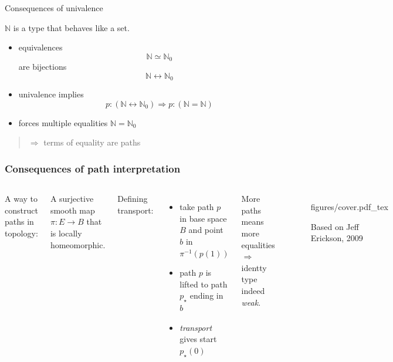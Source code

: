 \documentclass[english]{beamer}
\newcommand{\incfig}[1]{%
    \def\svgwidth{\columnwidth}
    {#1.pdf_tex}
}
\newcommand{\fig}[2]{
    \begin{figure}\begin{center}\texttt{[image: figures/\#1]}\caption{#2\label{#1}}\end{center}
    \end{figure}}
\newcommand{\tcol}[2]{
    \begin{columns}
        \column{.5\textwidth}
        #1
        \column{.5\textwidth}
        #2
    \end{columns}
}
\begin{document}
\begin{frame}{Consequences of univalence}

\begin{example}
$\mathbb{N}$ is a type that behaves like a set.
\begin{itemize}
    \item equivalences \[\mathbb{N} \simeq \mathbb{N}_0 \] are bijections \[\mathbb{N} \leftrightarrow \mathbb{N}_0 \]
    \item univalence implies \[ p : (\mathbb{N} \leftrightarrow \mathbb{N}_0 ) \Rightarrow p : (\mathbb{N} = \mathbb{N})\]

    \item forces multiple equalities $\mathbb{N} = \mathbb{N}_0$
\end{itemize}
\end{example}

\pause

\begin{quotation}
$\Rightarrow$ terms of equality are paths
\end{quotation}




\end{frame}



\begin{frame}[fragile]
    \frametitle{Consequences of path interpretation}
     
     
     
     
     \tcol{
        A way to construct paths in topology:
        \begin{definition}[Covering]
         A surjective smooth map $\pi : E \rightarrow B$ that is locally homeomorphic.
        \end{definition}

        
        Defining transport:
        \begin{itemize}
            \item take path $p$ in base space $B$ and point $b$ in $\pi^{-1}(p(1))$
            \item path $p$ is lifted to path $p_\star$ ending in $b$
            \item \emph{transport} gives start $p_\star(0)$
        \end{itemize}
        
        More paths means more equalities
        $\Rightarrow$ identty type indeed \emph{weak}.
        
     }
     {
        \begin{figure}
        \incfig{figures/cover}
        \caption{Based on Jeff Erickson, 2009}
        \end{figure}
     }     
\end{frame}
    
\end{document}
